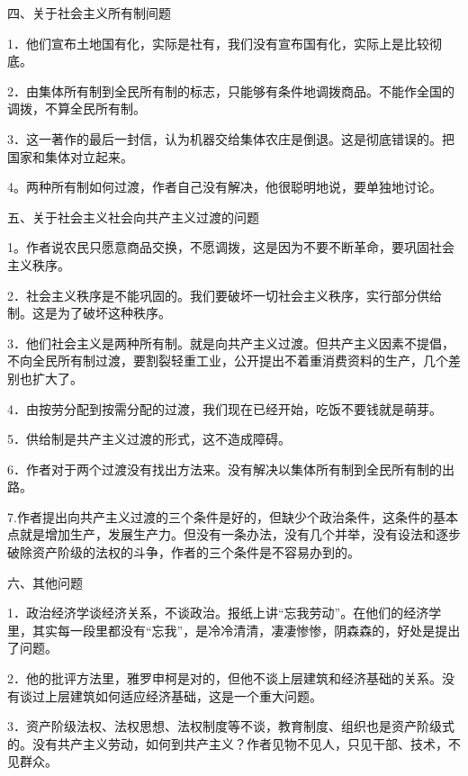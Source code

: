 四、关于社会主义所有制间题

1．他们宣布土地国有化，实际是社有，我们没有宣布国有化，实际上是比较彻底。

2．由集体所有制到全民所有制的标志，只能够有条件地调拨商品。不能作全国的调拨，不算全民所有制。

3．这一著作的最后一封信，认为机器交给集体农庄是倒退。这是彻底错误的。把国家和集体对立起来。

4。两种所有制如何过渡，作者自己没有解决，他很聪明地说，要单独地讨论。

五、关于社会主义社会向共产主义过渡的问题

1。作者说农民只愿意商品交换，不愿调拨，这是因为不要不断革命，要巩固社会主义秩序。

2．社会主义秩序是不能巩固的。我们要破坏一切社会主义秩序，实行部分供给制。这是为了破坏这种秩序。

3．他们社会主义是两种所有制。就是向共产主义过渡。但共产主义因素不提倡，不向全民所有制过渡，要割裂轻重工业，公开提出不着重消费资料的生产，几个差别也扩大了。

4．由按劳分配到按需分配的过渡，我们现在已经开始，吃饭不要钱就是萌芽。

5．供给制是共产主义过渡的形式，这不造成障碍。

6．作者对于两个过渡没有找出方法来。没有解决以集体所有制到全民所有制的出路。

7.作者提出向共产主义过渡的三个条件是好的，但缺少个政治条件，这条件的基本点就是增加生产，发展生产力。但没有一条办法，没有几个并举，没有设法和逐步破除资产阶级的法权的斗争，作者的三个条件是不容易办到的。

六、其他问题

1．政治经济学谈经济关系，不谈政治。报纸上讲“忘我劳动”。在他们的经济学里，其实每一段里都没有“忘我”，是冷冷清清，凄凄惨惨，阴森森的，好处是提出了问题。

2．他的批评方法里，雅罗申柯是对的，但他不谈上层建筑和经济基础的关系。没有谈过上层建筑如何适应经济基础，这是一个重大问题。

3．资产阶级法权、法权思想、法权制度等不谈，教育制度、组织也是资产阶级式的。没有共产主义劳动，如何到共产主义？作者见物不见人，只见干部、技术，不见群众。


